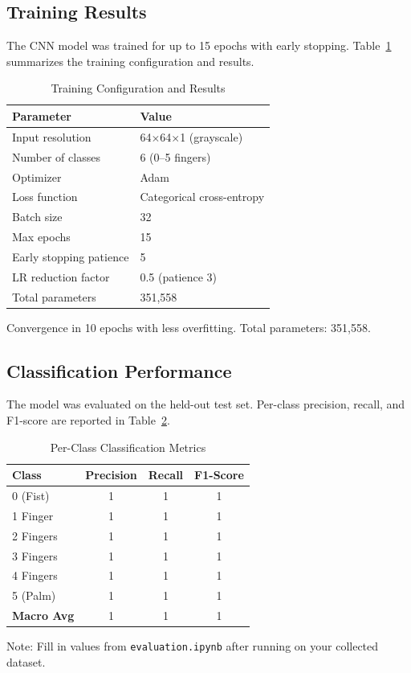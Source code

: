 \documentclass[conference]{IEEEtran}
\begin{document}
\subsection{Training Results}

The CNN model was trained for up to 15 epochs with early stopping. Table~\ref{tab:training_results} summarizes the training configuration and results.

\begin{table}[htbp]
\caption{Training Configuration and Results}
\label{tab:training_results}
\centering
\begin{tabular}{ll}
\toprule
\textbf{Parameter} & \textbf{Value} \\
\midrule
Input resolution & 64$\times$64$\times$1 (grayscale) \\
Number of classes & 6 (0--5 fingers) \\
Optimizer & Adam \\
Loss function & Categorical cross-entropy \\
Batch size & 32 \\
Max epochs & 15 \\
Early stopping patience & 5 \\
LR reduction factor & 0.5 (patience 3) \\
Total parameters & 351,558 \\
\bottomrule
\end{tabular}
\end{table}

Convergence in 10 epochs with less overfitting. Total parameters: 351,558.

\subsection{Classification Performance}

The model was evaluated on the held-out test set. Per-class precision, recall, and F1-score are reported in Table~\ref{tab:classification}.

\begin{table}[htbp]
\caption{Per-Class Classification Metrics}
\label{tab:classification}
\centering
\begin{tabular}{lccc}
\toprule
\textbf{Class} & \textbf{Precision} & \textbf{Recall} & \textbf{F1-Score} \\
\midrule
0 (Fist) & 1 & 1 & 1 \\
1 Finger & 1 & 1 & 1 \\
2 Fingers & 1 & 1 & 1 \\
3 Fingers & 1 & 1 & 1 \\
4 Fingers & 1 & 1 & 1 \\
5 (Palm) & 1 & 1 & 1 \\
\midrule
\textbf{Macro Avg} & 1 & 1 & 1 \\
\bottomrule
\end{tabular}
\begin{flushleft}
\footnotesize{Note: Fill in values from \texttt{evaluation.ipynb} after running on your collected dataset.}
\end{flushleft}
\end{table}
\end{document}
